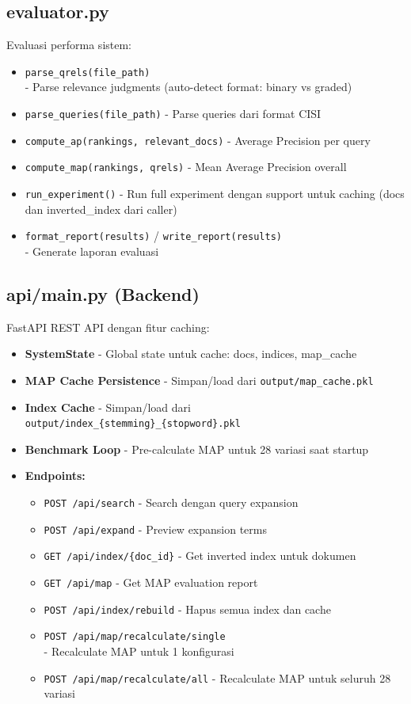 \documentclass[12pt,a4paper]{report}
\begin{document}
\subsection{evaluator.py}
Evaluasi performa sistem:
\begin{itemize}
    \item \texttt{parse\_qrels(file\_path)}\\ - Parse relevance judgments (auto-detect format: binary vs graded)
    \item \texttt{parse\_queries(file\_path)} - Parse queries dari format CISI
    \item \texttt{compute\_ap(rankings, relevant\_docs)} - Average Precision per query
    \item \texttt{compute\_map(rankings, qrels)} - Mean Average Precision overall
    \item \texttt{run\_experiment()} - Run full experiment dengan support untuk caching (docs dan inverted\_index dari caller)
    \item \texttt{format\_report(results)} / \texttt{write\_report(results)}\\ - Generate laporan evaluasi
\end{itemize}

\subsection{api/main.py (Backend)}
FastAPI REST API dengan fitur caching:
\begin{itemize}
    \item \textbf{SystemState} - Global state untuk cache: docs, indices, map\_cache
    \item \textbf{MAP Cache Persistence} - Simpan/load dari \texttt{output/map\_cache.pkl}
    \item \textbf{Index Cache} - Simpan/load dari \texttt{output/index\_\{stemming\}\_\{stopword\}.pkl}
    \item \textbf{Benchmark Loop} - Pre-calculate MAP untuk 28 variasi saat startup
    \item \textbf{Endpoints:}
    \begin{itemize}
        \item \texttt{POST /api/search} - Search dengan query expansion
        \item \texttt{POST /api/expand} - Preview expansion terms
        \item \texttt{GET /api/index/\{doc\_id\}} - Get inverted index untuk dokumen
        \item \texttt{GET /api/map} - Get MAP evaluation report
        \item \texttt{POST /api/index/rebuild} - Hapus semua index dan cache
        \item \texttt{POST /api/map/recalculate/single}\\ - Recalculate MAP untuk 1 konfigurasi
        \item \texttt{POST /api/map/recalculate/all} - Recalculate MAP untuk seluruh 28 variasi
    \end{itemize}
\end{itemize}
\end{document}
